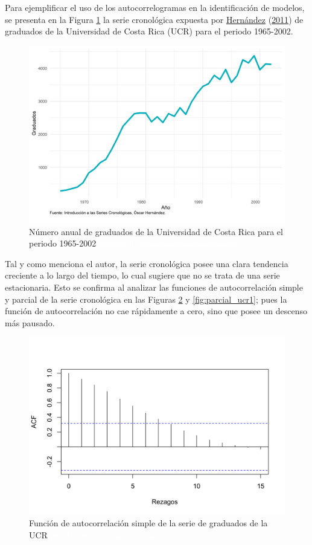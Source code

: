 \documentclass[
]{article}
\begin{document}
Para ejemplificar el uso de los autocorrelogramas en la identificación
de modelos, se presenta en la Figura \ref{fig:ejemplo_ucr} la serie
cronológica expuesta por \protect\hyperlink{ref-oscarh-1}{Hernández}
(\protect\hyperlink{ref-oscarh-1}{2011}) de graduados de la Universidad
de Costa Rica (UCR) para el periodo 1965-2002.

\begin{figure}[H]
\includegraphics[width=1\linewidth,height=1\textheight]{Tesis_files/figure-latex/ejemplo_ucr-1} \caption{Número anual de graduados de la Universidad de Costa Rica para el periodo 1965-2002 \textcolor{white}{prueba de aaaaaaaaaaaaaaaaaaaaaaa}}\label{fig:ejemplo_ucr}
\end{figure}

Tal y como menciona el autor, la serie cronológica posee una clara
tendencia creciente a lo largo del tiempo, lo cual sugiere que no se
trata de una serie estacionaria. Esto se confirma al analizar las
funciones de autocorrelación simple y parcial de la serie cronológica en
las Figuras \ref{fig:auto_ucr1} y \ref{fig:parcial_ucr1}; pues la
función de autocorrelación no cae rápidamente a cero, sino que posee un
descenso más pausado.

\begin{figure}[H]
\includegraphics[width=1\linewidth,height=1\textheight]{Tesis_files/figure-latex/auto_ucr1-1} \caption{Función de autocorrelación simple de la serie de graduados de la UCR \textcolor{white}{prueba de aaaaaaaaaaaaaaaaaaaaaaa}}\label{fig:auto_ucr1}
\end{figure}
\end{document}
